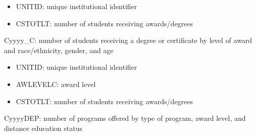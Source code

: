 \documentclass[sigconf, authorversion, nonacm]{acmart}
\begin{document}
        \begin{itemize}
            \item UNITID: unique institutional identifier
            \item CSTOTLT: number of students receiving awards/degrees
        \end{itemize}

        Cyyyy\_C: number of students receiving a degree or certificate by level of award and race/ethnicity, gender, and age

        \begin{itemize}
            \item UNITID: unique institutional identifier
            \item AWLEVELC: award level
            \item CSTOTLT: number of students receiving awards/degrees
        \end{itemize}

        CyyyyDEP: number of programs offered by type of program, award level, and distance education status
\end{document}
